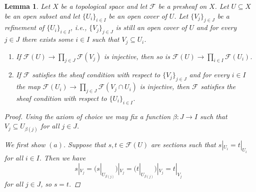 \documentclass[12pt,a4paper]{amsart}
\theoremstyle{plain}
\newtheorem{lm}[thm]{Lemma}
\theoremstyle{definition}
\theoremstyle{remark}
\begin{document}
\begin{lm}\label{lm:refinement}
  Let $X$ be a topological space and let $\mathscr{F}$ be a presheaf on $X$.
  Let $U \subseteq X$ be an open subset and let $\{ U_{i} \}_{i \in I}$ be an open cover of $U$.
  Let $\{ V_{j} \}_{j \in J}$ be a refinement of $\{ U_{i} \}_{i \in I}$, i.e., $\{ V_{j} \}_{j \in J}$ is still an open cover of $U$ and for every $j \in J$ there exists some $i \in I$ such that $V_{j} \subseteq U_{i}$.
  \begin{enumerate}[label=(\alph*)]
    \item If $\mathscr{F}(U) \to \prod_{j \in J} \mathscr{F}(V_{j})$ is injective, then so is $\mathscr{F}(U) \to \prod_{i \in I} \mathscr{F}(U_{i})$.
    \item If $\mathscr{F}$ satisfies the sheaf condition with respect to $\{ V_{j} \}_{j \in J}$ and for every $i \in I$ the map $\mathscr{F}(U_{i}) \to \prod_{j \in J} \mathscr{F}(V_{j} \cap U_{i})$ is injective, then $\mathscr{F}$ satisfies the sheaf condition with respect to $\{ U_{i} \}_{i \in I}$.
  \end{enumerate}
  \begin{proof}
    Using the axiom of choice we may fix a function $\beta \colon J \to I$ such that $V_{j} \subseteq U_{\beta(j)}$ for all $j \in J$.

    We first show $(a)$.
    Suppose that $s, t \in \mathscr{F}(U)$ are sections such that $s|_{U_{i}} = t|_{U_{i}}$ for all $i \in I$.
    Then we have
    \[ s|_{V_{j}} = (s|_{U_{\beta(j)}})|_{V_{j}} = (t|_{U_{\beta(j)}})|_{V_{j}} = t|_{V_{j}} \]
    for all $j \in J$, so $s = t$.


\end{proof}
\end{lm}
\end{document}
